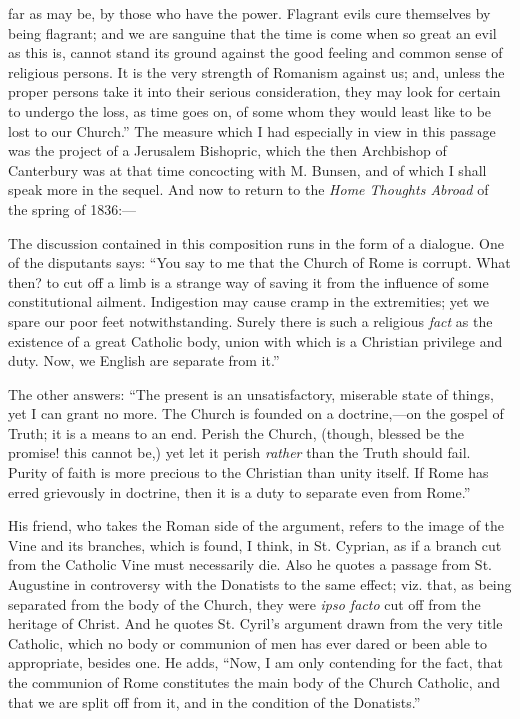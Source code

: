 far as may be, by those who have the power. Flagrant evils cure
themselves by being flagrant; and we are sanguine that the time is come
when so great an evil as this is, cannot stand its ground against the
good feeling and common sense of religious persons. It is the very
strength of Romanism against us; and, unless the proper persons take it
into their serious consideration, they may look for certain to undergo
the loss, as time goes on, of some whom they would least like to be lost
to our Church.'' The measure which I had especially in view in this
passage was the project of a Jerusalem Bishopric, which the then
Archbishop of Canterbury was at that time concocting with M. Bunsen, and
of which I shall speak more in the sequel. And now to return to the
\emph{Home
Thoughts Abroad} of the spring of 1836:—

The discussion contained in this composition runs in the form of a
dialogue. One of the disputants says: ``You say to me that the
Church of Rome is corrupt. What then? to cut off a limb is a strange way
of saving it from the influence of some constitutional ailment.
Indigestion may cause cramp in the extremities; yet we spare our poor
feet notwithstanding. Surely there is such a religious \emph{fact}
as the existence of a great Catholic body, union with which is a
Christian privilege and duty. Now, we English are separate from
it.''

The other answers: ``The present is an unsatisfactory, miserable
state of things, yet I can grant no more. The Church is founded on a
doctrine,—on the gospel of Truth; it is a means to an end. Perish the
Church, (though, blessed be the promise! this cannot be,) yet let it
perish \emph{rather} than the Truth should fail. Purity of faith is more
precious to the Christian than unity itself. If Rome has erred
grievously in doctrine, then it is a duty to separate even from
Rome.''

His friend, who takes the Roman side of the argument, refers to the
image of the Vine and its branches, which is found, I think, in St.
Cyprian, as if a branch cut from the Catholic Vine must necessarily die.
Also he quotes a passage from St. Augustine in controversy with the
Donatists to the same effect; viz. that, as being separated from the
body of the Church, they were \emph{ipso facto} cut off from the
heritage of Christ. And he quotes St. Cyril's argument drawn from the
very title Catholic, which no body or communion of men has ever dared or
been able to appropriate, besides one. He adds, ``Now, I am only
contending for the fact, that the communion of Rome constitutes the main
body of the Church Catholic, and that we are split off from it, and in
the condition of the Donatists.''

